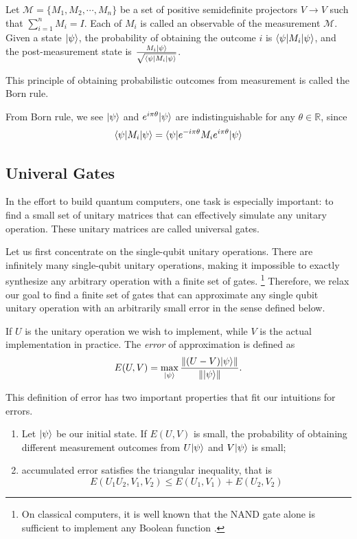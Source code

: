 Let $\mathcal{M} = \{M_1, M_2, \cdots, M_n\}$ be a set of positive semidefinite projectors $V \rightarrow V$ such that $\sum_{i=1}^n M_i = I$. 
Each of $M_i$ is called an observable of the measurement $\mathcal{M}$.
Given a state $|\psi\rangle$, the probability of obtaining the outcome $i$ is $\langle\psi| M_i |\psi\rangle$, and the post-measurement state is $\frac{M_i |\psi\rangle}{\sqrt{\langle\psi| M_i |\psi\rangle}}$.

This principle of obtaining probabilistic outcomes from measurement is called the Born rule.

From Born rule, we see $|\psi\rangle$ and $e^{i\pi \theta} |\psi\rangle$ are indistinguishable for any $\theta \in \mathbb{R}$, since 
$$
\langle\psi| M_i |\psi\rangle = \langle\psi| e^{-i\pi \theta} M_i e^{i\pi \theta} |\psi\rangle
$$


\subsection{Univeral Gates}

In the effort to build quantum computers, one task is especially important: to find a small set of unitary matrices that can effectively simulate any unitary operation.
These unitary matrices are called universal gates.

Let us first concentrate on the single-qubit unitary operations.
There are infinitely many single-qubit unitary operations, making it impossible to exactly synthesize any arbitrary operation with a finite set of gates. 
\footnote{On classical computers, it is well known that the NAND gate alone is sufficient to implement any Boolean function \cite{sheffer1913set}.}
Therefore, we relax our goal to find a finite set of gates that can approximate any single qubit unitary operation with an arbitrarily small error in the sense defined below. 

\begin{definition}
	If $U$ is the unitary operation we wish to implement, while $V$ is the actual implementation in practice. 
	The \emph{error} of approximation is defined as  
	\begin{equation}
		E(U, V) = \max_{|\psi\rangle} \frac{\| (U - V) |\psi\rangle \|}{\| |\psi\rangle \|}.
	\end{equation}
\end{definition}

This definition of error has two important properties that fit our intuitions for errors. 
\begin{enumerate}
	\item Let $|\psi\rangle$ be our initial state. If $E(U, V)$ is small, the probability of obtaining different measurement outcomes from $U |\psi\rangle$ and $V |\psi\rangle$ is small;
	\item accumulated error satisfies the triangular inequality, that is 
		$$
			E(U_1 U_2, V_1, V_2) \leq E(U_1, V_1) + E(U_2, V_2)
		$$
\end{enumerate}

